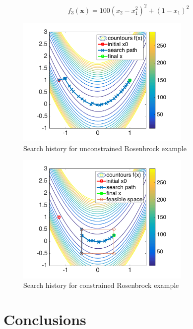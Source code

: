 \documentclass[11pt]{article}
\newcommand{\bs}[1]{\boldsymbol{#1}}
\begin{document}
\begin{equation}
f_3(\bs{x}) = 100(x_2-x_1^2)^2 + (1-x_1)^2 
\end{equation}

\begin{figure}[hbt]
\centering
\includegraphics[width=0.75\textwidth]{rosenbrock_unbounded}
\caption{Search history for unconstrained Rosenbrock example}
\label{fig:rosenbrock_unconstrained}
\end{figure}

\begin{figure}[hbt]
\centering
\includegraphics[width=0.75\textwidth]{rosenbrock_bounded}
\caption{Search history for constrained Rosenbrock example}
\label{fig:rosenbrock_constrained}
\end{figure}

\section{Conclusions}
\end{document}
